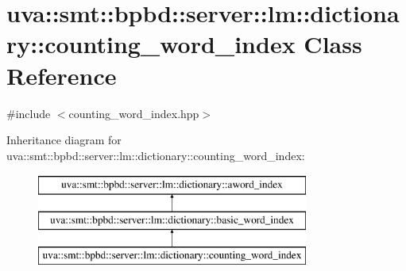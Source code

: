\hypertarget{classuva_1_1smt_1_1bpbd_1_1server_1_1lm_1_1dictionary_1_1counting__word__index}{}\section{uva\+:\+:smt\+:\+:bpbd\+:\+:server\+:\+:lm\+:\+:dictionary\+:\+:counting\+\_\+word\+\_\+index Class Reference}
\label{classuva_1_1smt_1_1bpbd_1_1server_1_1lm_1_1dictionary_1_1counting__word__index}


{\ttfamily \#include $<$counting\+\_\+word\+\_\+index.\+hpp$>$}

Inheritance diagram for uva\+:\+:smt\+:\+:bpbd\+:\+:server\+:\+:lm\+:\+:dictionary\+:\+:counting\+\_\+word\+\_\+index\+:\begin{figure}[H]
\begin{center}
\leavevmode
\includegraphics[height=3.000000cm]{classuva_1_1smt_1_1bpbd_1_1server_1_1lm_1_1dictionary_1_1counting__word__index}
\end{center}
\end{figure}

